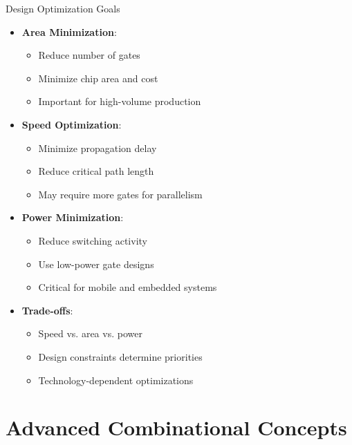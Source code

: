 \documentclass[aspectratio=169,11pt]{beamer}
\newcommand{\concept}[1]{\textbf{\color{accentcolor}#1}}
\begin{document}
\begin{frame}{Design Optimization Goals}
\begin{itemize}
\item \concept{Area Minimization}:
\begin{itemize}
\item Reduce number of gates
\item Minimize chip area and cost
\item Important for high-volume production
\end{itemize}
\vspace{0.3cm}
\item \concept{Speed Optimization}:
\begin{itemize}
\item Minimize propagation delay
\item Reduce critical path length
\item May require more gates for parallelism
\end{itemize}
\vspace{0.3cm}
\item \concept{Power Minimization}:
\begin{itemize}
\item Reduce switching activity
\item Use low-power gate designs
\item Critical for mobile and embedded systems
\end{itemize}
\vspace{0.3cm}
\item \concept{Trade-offs}:
\begin{itemize}
\item Speed vs. area vs. power
\item Design constraints determine priorities
\item Technology-dependent optimizations
\end{itemize}
\end{itemize}
\end{frame}

\section{Advanced Combinational Concepts}
\end{document}
